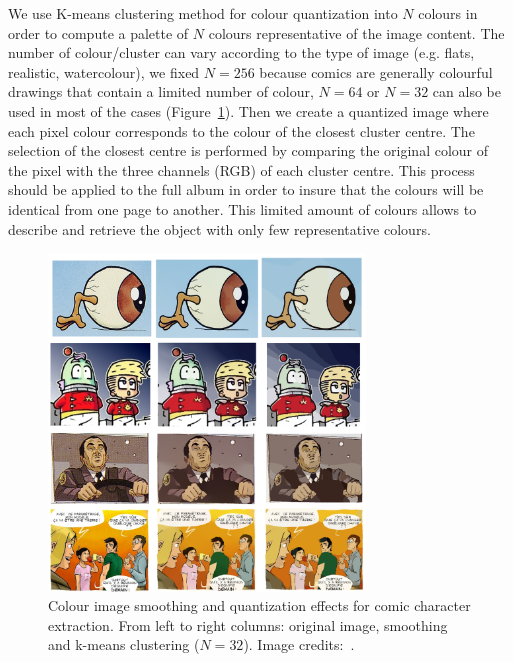 We use K-means clustering method for colour quantization into $N$ colours in order to compute a palette of $N$ colours representative of the image content.
The number of colour/cluster can vary according to the type of image (e.g. flats, realistic, watercolour), we fixed $N=256$ because comics are generally colourful drawings that contain a limited number of colour, $N=64$ or $N=32$ can also be used in most of the cases (Figure~\ref{fig:in:smoothing_quantization}).
Then we create a quantized image where each pixel colour corresponds to the colour of the closest cluster centre.
The selection of the closest centre is performed by comparing the original colour of the pixel with the three channels (RGB) of each cluster centre.
This process should be applied to the full album in order to insure that the colours will be identical from one page to another.
This limited amount of colours allows to describe and retrieve the object with only few representative colours.


  \begin{figure}[h!]  %
    \centering
    \includegraphics[trim= 0px 0px 0px 0px, clip, width=0.75\textwidth]{smoothing_quatization.png}
    \caption[Colour image smoothing and quantization for comic character extraction]{Colour image smoothing and quantization effects for comic character extraction. From left to right columns: original image, smoothing~\cite{l0smoothing2011} and k-means clustering ($N=32$). Image credits:~\cite{Noeils11,Bubble08,Boston10,Lubbin12}.}
    \label{fig:in:smoothing_quantization}
  \end{figure}


